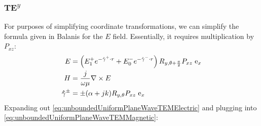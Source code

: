 \documentclass{article}
\numberwithin{equation}{section}
\begin{document}
            \subsubsection*{TE\textsuperscript{$y$}}
            For purposes of simplifying coordinate transformations, we can simplify the
            formula given in Balanis for the $E$ field. Essentially, it requires
            multiplication by $P_{xz}$:
            \begin{subequations} \label{eq:unboundedUniformPlaneWaveTEM}
                \begin{align}
                    E &= \left( E_1^+ e^{-\hat{\gamma}^+ \cdot r} + E_0^-
                        e^{-\hat{\gamma}^- \cdot r} \right) R_{y, \theta + \frac{\pi}{2}} 
                        P_{xz} \hspace{0.3em} \text{e}_x
                        \label{eq:unboundedUniformPlaneWaveTEMElectric} \\
                    H &= \frac{j}{\omega \mu} \nabla \times E
                        \label{eq:unboundedUniformPlaneWaveTEMMagnetic} \\
                    \mathbf{\hat{\gamma}}^{\pm} &= \pm ( \alpha + jk )R_{y, \theta} P_{xz}
                        \hspace{0.3em} \text{e}_x 
                \end{align}
            \end{subequations}
            Expanding out \eqref{eq:unboundedUniformPlaneWaveTEMElectric} and plugging
            into \eqref{eq:unboundedUniformPlaneWaveTEMMagnetic}:
\end{document}
